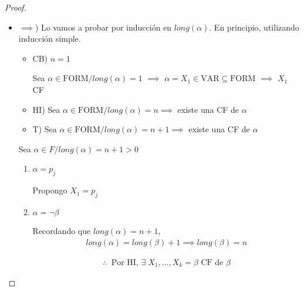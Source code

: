 \begin{proof} \phantom{.}

    \begin{itemize}
        \item $\implies$) Lo vamos a probar por inducción en $long(\alpha)$.
            En principio, utilizando inducción simple.

        \begin{itemize}
            \item CB) $n=1$

                Sea
                $\alpha \in \mathrm{FORM} / long(\alpha) = 1$
                $\implies$ 
                $\alpha = X_1 \in \mathrm{VAR} \subseteq \mathrm{FORM}$
                $\implies$ 
                $X_1$ CF
            \item HI) Sea $\alpha \in \mathrm{FORM}/ long(\alpha) = n \implies$ 
                existe una CF de $\alpha$
            \item T) Sea $\alpha \in \mathrm{FORM}/ long(\alpha) = n + 1 \implies$
                existe una CF de $\alpha$ 
        \end{itemize}
        
        \medskip

        Sea $\alpha \in F / long(\alpha) = n + 1 > 0$

        \begin{enumerate}[%
                labelindent=*,
                style=multiline,
                leftmargin=*,
                align=left,
                leftmargin=2\parindent,
                label=Caso \arabic*)]
            \item $\alpha = p_j$

                Propongo $X_1 = p_j$

            \item $\alpha = \neg \beta$ %

                Recordando que $long(\alpha) = n+1$,
                \begin{gather*}
                    long(\alpha) = long(\beta) + 1
                    \implies
                    long(\beta) = n
                \end{gather*}

                \begin{gather*}
                    \therefore ~ \text{ Por HI, } \exists \; X_1, 
                    \dotsc, X_k = \beta \text{ CF de } \beta
                \end{gather*}


\end{enumerate}
\end{itemize}
\end{proof}
